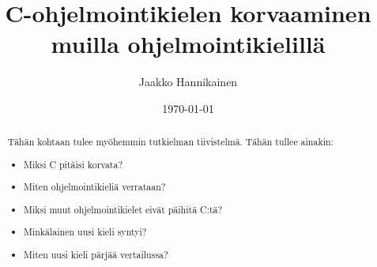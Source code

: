 \documentclass[gradu]{tktltiki}
\renewcommand{\BOthers}[1]{ja muut\hbox{}}%
\renewcommand{\BOthersPeriod}[1]{ja muut\hbox{}}%
\begin{document}
\title{C-ohjelmointikielen korvaaminen muilla ohjelmointikielillä}
\author{Jaakko Hannikainen}
\date{\today}

\hypersetup{pageanchor=false}
\maketitle
\hypersetup{pageanchor=false}



\begin{abstract}
    Tähän kohtaan tulee myöhemmin tutkielman tiivistelmä. Tähän tullee ainakin:
    \begin{itemize}
        \item Miksi C pitäisi korvata?
        \item Miten ohjelmointikieliä verrataan?
        \item Miksi muut ohjelmointikielet eivät päihitä C:tä?
        \item Minkälainen uusi kieli syntyi?
        \item Miten uusi kieli pärjää vertailussa?
    \end{itemize}

\end{abstract}

\newpage
\tocbeginshere
{}

\mytableofcontents


\newpage

\newpage

\newpage

\newpage

\newpage

\newpage

\renewcommand{\bibname}{Lähteet}
\renewcommand{\BRetrievedFrom}{Saatavilla\ }
\renewcommand{\BOthers}[1]{ja muut\hbox{}}
\renewcommand{\BOthersPeriod}[1]{ja muut\hbox{}}
\renewcommand*{\bibfont}{\interlinepenalty 10000\relax}



\appendixbeginhere
{}
\appendixendhere
\end{document}
